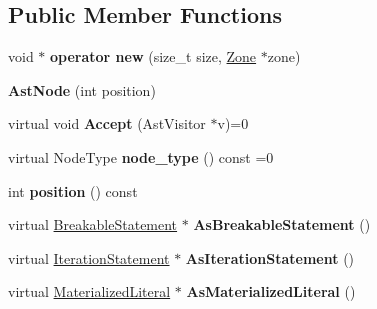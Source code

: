 \subsection*{Public Member Functions}
\begin{DoxyCompactItemize}
\item 
void $\ast$ {\bfseries operator new} (size\+\_\+t size, \hyperlink{classv8_1_1internal_1_1_zone}{Zone} $\ast$zone)\hypertarget{classv8_1_1internal_1_1_ast_node_a3b42cf9e8f0c9685573ab0f445d30856}{}\label{classv8_1_1internal_1_1_ast_node_a3b42cf9e8f0c9685573ab0f445d30856}

\item 
{\bfseries Ast\+Node} (int position)\hypertarget{classv8_1_1internal_1_1_ast_node_a68e77a52aeaab6205eed81558e39b51b}{}\label{classv8_1_1internal_1_1_ast_node_a68e77a52aeaab6205eed81558e39b51b}

\item 
virtual void {\bfseries Accept} (Ast\+Visitor $\ast$v)=0\hypertarget{classv8_1_1internal_1_1_ast_node_a997460b9c5bb89418e5e2a3e760598bd}{}\label{classv8_1_1internal_1_1_ast_node_a997460b9c5bb89418e5e2a3e760598bd}

\item 
virtual Node\+Type {\bfseries node\+\_\+type} () const  =0\hypertarget{classv8_1_1internal_1_1_ast_node_a9dc5ff1661ce3dd6e2bf20f5ef631a60}{}\label{classv8_1_1internal_1_1_ast_node_a9dc5ff1661ce3dd6e2bf20f5ef631a60}

\item 
int {\bfseries position} () const \hypertarget{classv8_1_1internal_1_1_ast_node_ac0e91623e58fe05cab42baa305244763}{}\label{classv8_1_1internal_1_1_ast_node_ac0e91623e58fe05cab42baa305244763}

\item 
virtual \hyperlink{classv8_1_1internal_1_1_breakable_statement}{Breakable\+Statement} $\ast$ {\bfseries As\+Breakable\+Statement} ()\hypertarget{classv8_1_1internal_1_1_ast_node_abe218efc9b25b70a3b41dae3c770be66}{}\label{classv8_1_1internal_1_1_ast_node_abe218efc9b25b70a3b41dae3c770be66}

\item 
virtual \hyperlink{classv8_1_1internal_1_1_iteration_statement}{Iteration\+Statement} $\ast$ {\bfseries As\+Iteration\+Statement} ()\hypertarget{classv8_1_1internal_1_1_ast_node_aaa1521749945a0854c729246a1661132}{}\label{classv8_1_1internal_1_1_ast_node_aaa1521749945a0854c729246a1661132}

\item 
virtual \hyperlink{classv8_1_1internal_1_1_materialized_literal}{Materialized\+Literal} $\ast$ {\bfseries As\+Materialized\+Literal} ()\hypertarget{classv8_1_1internal_1_1_ast_node_a7025f31bbb7c7df1d753d06d2efd31fa}{}\label{classv8_1_1internal_1_1_ast_node_a7025f31bbb7c7df1d753d06d2efd31fa}


\end{DoxyCompactItemize}
